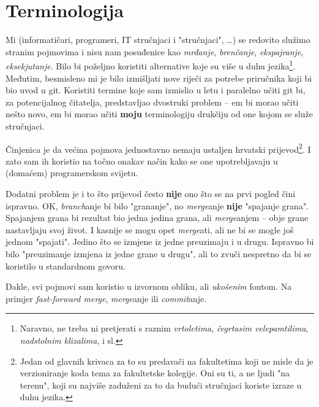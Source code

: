 \chapter*{Terminologija}

Mi (informatičari, programeri, IT stručnjaci i "stručnjaci", \dots) se redovito služimo stranim pojmovima i nisu nam posuđenice kao \emph{mrđanje}, \emph{brenčanje}, \emph{ekspajranje}, \emph{eksekjutanje}.
Bilo bi poželjno koristiti alternative koje su više u duhu jezika\footnote{Naravno, ne treba ni pretjerati s raznim \emph{vrtoletima}, \emph{čegrtasim velepamtilima}, \emph{nadstolnim klizalima}, i sl.}.
Međutim, besmisleno mi je bilo izmišljati nove riječi za potrebe priručnika koji bi bio uvod u git.
Koristiti termine koje sam izmislio u letu i paralelno učiti git bi, za potencijalnog čitatelja, predstavljao dvostruki problem -- em bi morao učiti nešto novo, em bi morao učiti \textbf{moju} terminologiju drukčiju od one kojom se služe stručnjaci.

Činjenica je da većina pojmova jednostavno nemaju ustaljen hrvatski prijevod\footnote{Jedan od glavnih krivaca za to su predavači na fakultetima koji ne misle da je verzioniranje koda tema za fakultetske kolegije. Oni su ti, a ne ljudi "na terenu", koji su najviše zaduženi za to da budući stručnjaci koriste izraze u duhu jezika.}. 
I zato sam ih koristio na točno onakav način kako se one upotrebljavaju u (domaćem) programerskom svijetu.

Dodatni problem je i to što prijevod često \textbf{nije} ono što se na prvi pogled čini ispravno.
OK, \emph{branch}anje bi bilo "grananje", no \emph{merge}anje \textbf{nije} "spajanje grana". 
Spajanjem grana bi rezultat bio jedna jedina grana, ali \emph{merge}anjem -- obje grane nastavljaju svoj život. 
I kasnije se mogu opet \emph{merge}ati, ali ne bi se mogle još jednom "spajati".
Jedino što se izmjene iz jedne preuzimaju i u drugu. 
Ispravno bi bilo "preuzimanje izmjena iz jedne grane u drugu", ali to zvuči nespretno da bi se koristilo u standardnom govoru.

Dakle, svi pojmovi sam koristio u izvornom obliku, ali \emph{ukošenim} fontom. Na primjer \emph{fast-forward merge}, \emph{merge}anje ili \emph{commit}anje.


